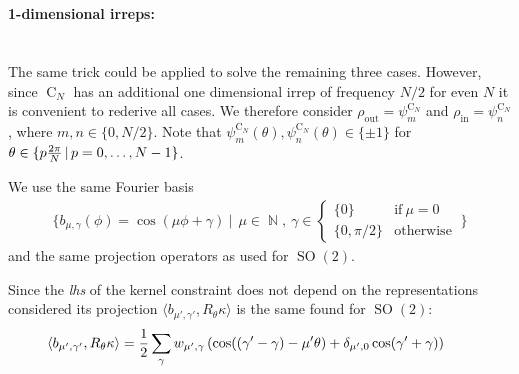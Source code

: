 \documentclass{article}
\newcommand{\lp}{\left(}
\newcommand{\rp}{\right)}
\DeclareMathOperator*{\N}{\mathbb{N}}
\newcommand{\SO}[1]{\ensuremath{\operatorname{SO}(#1)}}
\newcommand{\CN}{\ensuremath{\operatorname{C}_{\!N}}}
\begin{document}
~\\[-4.ex]
\paragraph{1-dimensional irreps:}~\\[.75ex]
The same trick could be applied to solve the remaining three cases.
However, since $\CN$ has an additional one dimensional irrep of frequency $N/2$ for even $N$ it is convenient to rederive all cases.
We therefore consider $\rho_\text{out}=\psi_m^{\CN}$ and $\rho_\text{in}=\psi_n^{\CN}$, where $m,n \in \{0, N/2\}$.
Note that $\psi_m^{\CN}(\theta),\psi_n^{\CN}(\theta) \in \{\pm 1\}$ for $\theta\in\{p {2\pi\over N} \,|\, p=0,\dots,N-1\}$.

We use the same Fourier basis 
\begin{align}\label{eq:cn_1x1_starting_basis}
\Bigg\{ b_{\mu,\gamma}(\phi) = \cos(\mu\phi +\gamma) \ \Bigg|\ \ \mu \in \N,\ \gamma \in 
        \begin{cases}
            \{0\}        &\!\!\text{if}\ \mu=0 \\[-1pt]
            \{0, \pi/2\} &\!\!\text{otherwise}
        \end{cases}
        \ 
    \Bigg\}
\end{align}
and the same projection operators as used for $\SO2$.

Since the \textit{lhs} of the kernel constraint does not depend on the representations considered its projection $\langle b_{\mu',\gamma'},  R_{\theta} \kappa \rangle$ is the same found for $\SO2$:
\begin{align*}
	& \langle b_{\mu',\gamma'},  R_{\theta} \kappa \rangle
	= {1\over2} \sum_{\gamma} w_{\mu', \gamma} \lp\cos((\gamma'-\gamma) - \mu'\theta) + \delta_{\mu', 0}\cos(\gamma'+\gamma) \rp &&
\end{align*}
\end{document}
